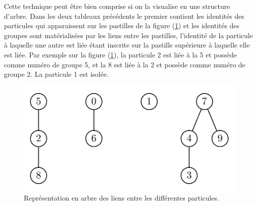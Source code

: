 Cette technique peut être bien comprise si on la visualise en une structure d'arbre. Dans les deux tableaux précédents le premier
contient les identités des particules qui apparaissent sur les pastilles de la figure (\ref{fig:arbre1}) et les identités des
groupes sont matérialisées par les liens entre les pastilles, l'identité de la particule à laquelle une autre est liée étant
inscrite sur la pastille supérieure à laquelle elle est liée. Par exemple sur la figure (\ref{fig:arbre1}), la particule 2 est liée
à la 5 et possède comme numéro de groupe 5, et la 8 est liée à la 2 et possède comme numéro de groupe 2. La particule 1 est isolée.
\begin{figure}[htb]
	\centering
	\includegraphics[width=0.5\linewidth]{arbre1.png}
	\caption{\footnotesize{}Représentation en arbre des liens entre les différentes particules.}
	\label{fig:arbre1}
\end{figure}

